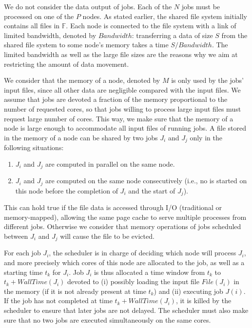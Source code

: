 \documentclass[conference,10pt]{IEEEtran}
\newcommand{\Node}[1]{\ensuremath{\mathrm{Node}_{#1}}\xspace}
\newcommand{\file}{\ensuremath{\mathit{File}}\xspace}
\newcommand{\storage}{\ensuremath{\mathit{Storage}}\xspace}
\newcommand{\size}{\ensuremath{\mathit{Size}}\xspace}
\newcommand{\memory}{\ensuremath{\mathit{M}}\xspace}
\newcommand{\bandwidth}{\mathit{Bandwidth}\xspace}
\newcommand{\walltime}{\mathit{WallTime}\xspace}
\newcommand{\fileset}{\ensuremath{\mathbb{F}}\xspace}
\begin{document}
We do not consider the data output of jobs.
Each of the $N$ jobs must be processed on one of the $P$ nodes.  As
stated earlier, the shared file system initially contains all files
in $\fileset$.  Each node is connected to the file system with a link
of limited bandwidth, denoted by $\bandwidth$: transferring a data of
size $S$ from the shared file system to some node's memory takes a
time $S/\bandwidth$.
The limited bandwidth
as well as the large file sizes are the reasons why we aim at
restricting the amount of data movement.

We consider that the memory of a node, denoted by
$\memory$ is only used by the jobs' input files, since all other data are
negligible compared with the input files. We assume that jobs are
devoted a fraction of the memory proportional to the number of
requested cores, so that jobs willing to process large input files
must request large number of cores. This way, we make sure that the
memory of a node is large enough to accommodate all input files of running jobs.
A file stored in the memory of a node can be shared by two jobs $J_i$ and $J_j$ only in the following situations:
\begin{enumerate}
	\item $J_i$ and $J_j$ are computed in parallel on the same node.
	\item $J_i$ and $J_j$ are computed on the same node
          consecutively (i.e., no is started on this node before the
          completion of $J_i$ and the start of $J_j$).
\end{enumerate}
This can hold true if the file data is accessed through I/O (traditional or memory-mapped),
allowing the same page cache to serve multiple processes from different jobs.
Otherwise we consider that memory operations of jobs scheduled between
$J_i$ and $J_j$ will cause the file to be evicted.


For each job $J_i$, the scheduler is in charge of deciding which node
will process $J_i$, and more precisely which cores of this node
are allocated to the job, as well as a starting time $t_k$ for $J_i$. Job
$J_i$ is thus allocated a time window from $t_k$ to
$t_k+\walltime(J_i)$ devoted to (i) possibly loading the input file
$\file(J_i)$ in the memory (if it is not already present at time
$t_k$) and (ii) executing job $J(i)$. If the job has not completed at
time $t_k+\walltime(J_i)$, it is killed by the scheduler to ensure
that later jobs are not delayed.  The scheduler must also make sure
that no two jobs are executed simultaneously on the same cores.
\end{document}
